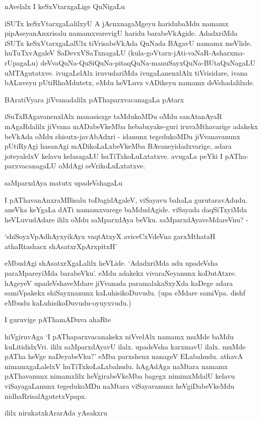 nAvelalx I keSxVtarxgaLige QuNigaLu

iSUTx keSxVtarxgaLalilxyU A jAcnxnagaMgeyu haridubaMdu namamx pipAseyanAnxrisalu namamxvarevigU haridu barabeVkAgide. AdadxriMda iSUTx keSxVtarxgaLalUlx tiVrisabeVkAda QuNada BAgavU namamx meVlide. huTuTxvAgaleV SaDevxVSaTxnagaLU (kula-goVtarx-jAti-vaNaR-Asharxma-rUpagaLu) deVvaQuNa-QuSiQuNa-pitaqQuNa-manuSayxQuNa-BUtaQuNagaLU uMTAgutatxve. ivugaLelAlx iruvudariMda ivugaLanenxlAlx tiVrisidare, ivana bALuveyu pUtiRhoMdutetx, eMdu heVLuva vADikeyu namamx deVshadalilxde.

BAratiVyara jiVvanadalilx pAThaparxvacanagaLa pAtarx

iSuTxBAgavanenxlAlx manasisxge taMdukoMDu oMdu sanAtanAyaR mAgaRdalilx jiVvana mADabeVkeMba hebabxyake-guri iruvaMthavarige adakekx beVkAda oMdu shisutx-javAbAdxri - idanunx tegedukoMDu jiVvanavanunx pUtiRyAgi hasanAgi mADikoLaLxbeVkeMba BAvaneyidadxvarige, adara joteyalelxV kelavu kelasagaLU huTiTxkoLuLxtatxve. avugaLa peYki I pATha-parxvacanagaLU oMdAgi seVrikoLuLxtatxve.

saMparxdAya matutx upadeVshagaLu

I pAThavanAnxraMBisalu toDagidAgaleV, viSayavu bahaLa gurutaravAdudu. aneVka keYgaLa dATi namamxvarege baMdudAgide. viSayada daqSiTxyiMda heVLuvudAdare ililx oMdu saMparxdAya beVku. saMparxdAyaveMdareVnu? -

\begin{shloka}
`shiSoyxVpAdhAyxyikAyx vaqtAtxyX aviceCxVdeVna garxMthataH athaRtashacx shAsatxrXpArxpitxH'
\end{shloka}

eMbudAgi shAsatxrXgaLalilx heVLide. `AdadxriMda adu upadeVsha paraMpareyiMda barabeVku'. eMdu adakekx vivaraNeyanunx koDutAtxre. hAgeyeV upadeVshaveMdare jiVvanada paramalakaSxyXda kaDege adara samiVpakekx shiSayxnanunx kaLuhisikoDuvudu. (upa eMdare samiVpa. dishf eMbudu kaLuhisikoDuvudu-oyuyxvudu.)

I guruvige pAThamADuva ahaRte

hiVgiruvAga `I pAThaparxvacanakekx niVvelAlx namamx muMde baMdu kuLitididxVri. ililx saMparxdAyavU ilalx. upadeVsha karxmavU ilalx. muMde pATha heVge naDeyabeVku?' eMba parxshenx nanageV ELabahudu. athavA nimamxgaLalelxV huTiTxkoLaLxbahudu. hAgAdAga naMtara namamx pAThavanunx nimamxlilx heVgirabeVkeMba bagegx nimimxMdalU kelavu viSayagaLanunx tegedukoMDu naMtara viSayavanunx heVgiDabeVkeMdu nidhaRrisalAgutetxVpapx.

ililx nirukatxkArarAda yAsakxru

